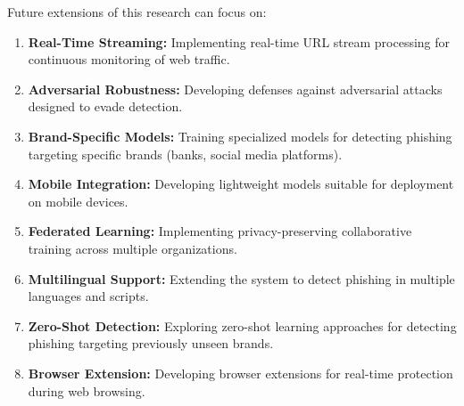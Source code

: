 \documentclass[12pt,a4paper]{report}
\begin{document}
Future extensions of this research can focus on:

\begin{enumerate}
    \item \textbf{Real-Time Streaming:} Implementing real-time URL stream processing for continuous monitoring of web traffic.
    
    \item \textbf{Adversarial Robustness:} Developing defenses against adversarial attacks designed to evade detection.
    
    \item \textbf{Brand-Specific Models:} Training specialized models for detecting phishing targeting specific brands (banks, social media platforms).
    
    \item \textbf{Mobile Integration:} Developing lightweight models suitable for deployment on mobile devices.
    
    \item \textbf{Federated Learning:} Implementing privacy-preserving collaborative training across multiple organizations.
    
    \item \textbf{Multilingual Support:} Extending the system to detect phishing in multiple languages and scripts.
    
    \item \textbf{Zero-Shot Detection:} Exploring zero-shot learning approaches for detecting phishing targeting previously unseen brands.
    
    \item \textbf{Browser Extension:} Developing browser extensions for real-time protection during web browsing.
\end{enumerate}
\end{document}
